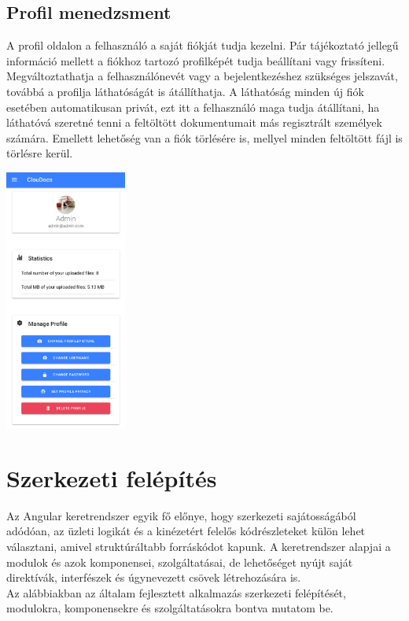 \documentclass[12pt]{report}
\begin{document}
\subsection{Profil menedzsment}
A profil oldalon a felhasználó a saját fiókját tudja kezelni. Pár tájékoztató jellegű információ mellett a fiókhoz tartozó profilképét tudja beállítani vagy frissíteni. Megváltoztathatja a felhasználónevét vagy a bejelentkezéshez szükséges jelszavát, továbbá a profilja láthatóságát is átállíthatja. A láthatóság minden új fiók esetében automatikusan privát, ezt itt a felhasználó maga tudja átállítani, ha láthatóvá szeretné tenni a feltöltött dokumentumait más regisztrált személyek számára. Emellett lehetőség van a fiók törlésére is, mellyel minden feltöltött fájl is törlésre kerül.

\begin{center}
	\includegraphics[width=40mm,scale=0.5,]{profile.png}
\end{center}

\section{Szerkezeti felépítés}
Az Angular keretrendszer egyik fő előnye, hogy szerkezeti sajátosságából adódóan, az üzleti logikát és a kinézetért felelős kódrészleteket külön lehet választani, amivel struktúráltabb forráskódot kapunk. A keretrendszer alapjai a modulok és azok komponensei, szolgáltatásai, de lehetőséget nyújt saját direktívák, interfészek és úgynevezett csövek létrehozására is.\\
Az alábbiakban az általam fejlesztett alkalmazás szerkezeti felépítését, modulokra, komponensekre és szolgáltatásokra bontva mutatom be.
\end{document}
